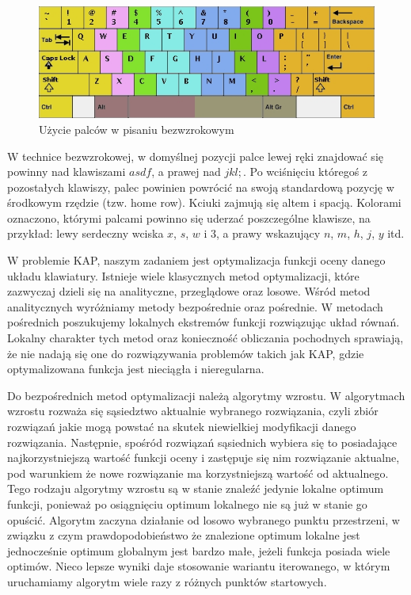 \documentclass{xmgr}
\begin{document}
\begin{figure}[!tbh]
\centering
\includegraphics[width=.8\hsize]{fig/touchtyping}
\caption{Użycie palców w pisaniu bezwzrokowym}
\end{figure}

W technice bezwzrokowej, w domyślnej pozycji palce lewej ręki znajdować się powinny nad klawiszami $asdf$, a prawej nad $jkl;$. Po wciśnięciu któregoś z pozostałych klawiszy, palec powinien powrócić na swoją standardową pozycję w środkowym rzędzie (tzw. home row). Kciuki zajmują się altem i spacją. Kolorami oznaczono, którymi palcami powinno się uderzać poszczególne klawisze, na przykład: lewy serdeczny wciska $x$, $s$, $w$ i $3$, a prawy wskazujący $n$, $m$, $h$, $j$, $y$ itd.

W problemie KAP, naszym zadaniem jest optymalizacja funkcji oceny danego układu klawiatury. Istnieje wiele klasycznych metod optymalizacji, które zazwyczaj dzieli się na analityczne, przeglądowe oraz losowe. Wśród metod analitycznych wyróżniamy metody bezpośrednie oraz pośrednie. W metodach pośrednich poszukujemy lokalnych ekstremów funkcji rozwiązując układ równań. Lokalny charakter tych metod oraz konieczność obliczania pochodnych sprawiają, że nie nadają się one do rozwiązywania problemów takich jak KAP, gdzie optymalizowana funkcja jest nieciągła i nieregularna.

Do bezpośrednich metod optymalizacji należą algorytmy wzrostu. W algorytmach wzrostu rozważa się sąsiedztwo aktualnie wybranego rozwiązania, czyli zbiór rozwiązań jakie mogą powstać na skutek niewielkiej modyfikacji danego rozwiązania. Następnie, spośród rozwiązań sąsiednich wybiera się to posiadające najkorzystniejszą wartość funkcji oceny i zastępuje się nim rozwiązanie aktualne, pod warunkiem że nowe rozwiązanie ma korzystniejszą wartość od aktualnego. Tego rodzaju algorytmy wzrostu są w stanie znaleźć jedynie lokalne optimum funkcji, ponieważ po osiągnięciu optimum lokalnego nie są już w stanie go opuścić. Algorytm zaczyna działanie od losowo wybranego punktu przestrzeni, w związku z czym prawdopodobieństwo że znalezione optimum lokalne jest jednocześnie optimum globalnym jest bardzo małe, jeżeli funkcja posiada wiele optimów. Nieco lepsze wyniki daje stosowanie wariantu iterowanego, w którym uruchamiamy algorytm wiele razy z różnych punktów startowych.
\end{document}
